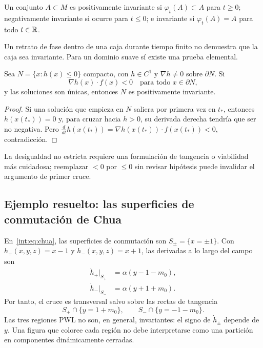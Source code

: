 \begin{definition}[Invariancia]
Un conjunto \(A\subset M\) es positivamente invariante si
\(\varphi_t(A)\subset A\) para \(t\ge0\); negativamente invariante si ocurre
para \(t\le0\); e invariante si \(\varphi_t(A)=A\) para todo \(t\in\mathbb{R}\).
\end{definition}

Un retrato de fase dentro de una caja durante tiempo finito no demuestra que
la caja sea invariante. Para un dominio suave sí existe una prueba elemental.

\begin{proposition}
Sea \(N=\{x:h(x)\le0\}\) compacto, con \(h\in C^1\) y
\(\nabla h\ne0\) sobre \(\partial N\). Si
\begin{equation}
 \nabla h(x)\cdot f(x)<0
 \quad\text{para todo }x\in\partial N,
 \label{geo:eq:strict-inward}
\end{equation}
y las soluciones son únicas, entonces \(N\) es positivamente invariante.
\end{proposition}

\begin{proof}
Si una solución que empieza en \(N\) saliera por primera vez en \(t_*\),
entonces \(h(x(t_*))=0\) y, para cruzar hacia \(h>0\), su derivada derecha
tendría que ser no negativa. Pero
\(\frac{d}{dt}h(x(t_*))=\nabla h(x(t_*))\cdot f(x(t_*))<0\), contradicción.
\end{proof}



La desigualdad no estricta requiere una formulación de tangencia o viabilidad
más cuidadosa; reemplazar \(<0\) por \(\le0\) sin revisar hipótesis puede
invalidar el argumento de primer cruce.

\subsection{Ejemplo resuelto: las superficies de conmutación de Chua}

En~\eqref{int:eq:chua}, las superficies de conmutación son
\(S_\pm=\{x=\pm1\}\). Con \(h_+(x,y,z)=x-1\) y
\(h_-(x,y,z)=x+1\), las derivadas a lo largo del campo son
\begin{align}
 \dot h_+\big|_{S_+}&=\alpha(y-1-m_0),\nonumber\\
 \dot h_-\big|_{S_-}&=\alpha(y+1+m_0).
 \label{geo:eq:chua-switch-lie}
\end{align}
Por tanto, el cruce es transversal salvo sobre las rectas de tangencia
\begin{equation}
 S_+\cap\{y=1+m_0\},\qquad
 S_-\cap\{y=-1-m_0\}.
 \label{geo:eq:chua-grazing-lines}
\end{equation}
Las tres regiones PWL no son, en general, invariantes: el signo de
\(\dot h_\pm\) depende de \(y\). Una figura que coloree cada región no debe
interpretarse como una partición en componentes dinámicamente cerradas.

